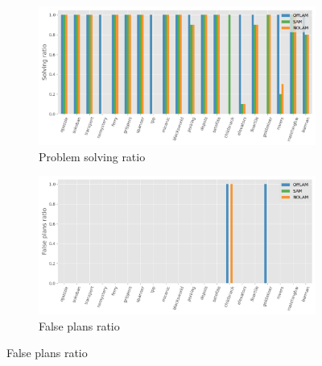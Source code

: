\begin{figure}[htbp]
  \begin{subfigure}[b]{0.45\textwidth}
    \includegraphics[width=\textwidth]{figures/solving.png}
    \caption{Problem solving ratio}
  \end{subfigure}
  \hfill
  \begin{subfigure}[b]{0.45\textwidth}
    \includegraphics[width=\textwidth]{figures/false_plans.png}
    \caption{False plans ratio}
    \label{fig:false-positive-plans}
  \end{subfigure}

  \label{fig:exp}
\end{figure}